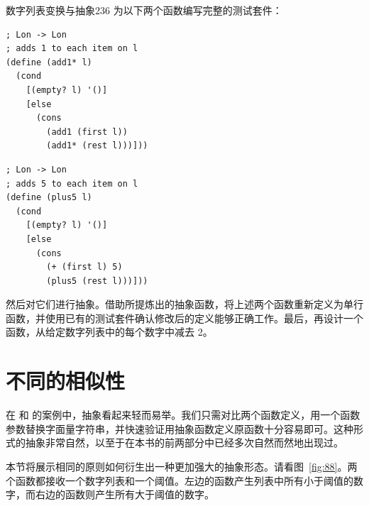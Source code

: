 \begin{exercise}{数字列表变换与抽象}{236}
为以下两个函数编写完整的测试套件：

\begin{stepperbox}
  \noindent\begin{minipage}[t]{0.48\linewidth}\vspace{0pt}
\begin{Verbatim}[commandchars=\\\{\}, fontsize=\fontsize{6.0pt}{7.2pt}\selectfont]
; Lon -> Lon
; adds 1 to each item on l
(define (add1* l)
  (cond
    [(empty? l) '()]
    [else
      (cons
        (add1 (first l))
        (add1* (rest l)))]))
\end{Verbatim}
  \end{minipage}\hfill
  \begin{minipage}[t]{0.48\linewidth}\vspace{0pt}
\begin{Verbatim}[commandchars=\\\{\}, fontsize=\fontsize{6.0pt}{7.2pt}\selectfont]
; Lon -> Lon
; adds 5 to each item on l
(define (plus5 l)
  (cond
    [(empty? l) '()]
    [else
      (cons
        (+ (first l) 5)
        (plus5 (rest l)))]))
\end{Verbatim}
  \end{minipage}
\end{stepperbox}

然后对它们进行抽象。借助所提炼出的抽象函数，将上述两个函数重新定义为单行函数，并使用已有的测试套件确认修改后的定义能够正确工作。最后，再设计一个函数，从给定数字列表中的每个数字中减去 2。
\end{exercise}

\section{不同的相似性}
\label{sec:14_2}

在  和  的案例中，抽象看起来轻而易举。我们只需对比两个函数定义，用一个函数参数替换字面量字符串，并快速验证用抽象函数定义原函数十分容易即可。这种形式的抽象非常自然，以至于在本书的前两部分中已经多次自然而然地出现过。

本节将展示相同的原则如何衍生出一种更加强大的抽象形态。请看图~\ref{fig:88}。两个函数都接收一个数字列表和一个阈值。左边的函数产生列表中所有小于阈值的数字，而右边的函数则产生所有大于阈值的数字。


